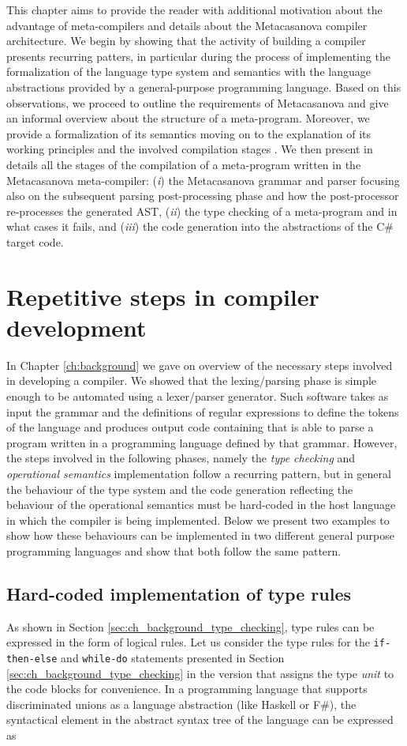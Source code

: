 This chapter aims to provide the reader with additional motivation about the advantage of meta-compilers and details about the Metacasanova compiler architecture. We begin by showing that the activity of building a compiler presents recurring patters, in particular during the process of implementing the formalization of the language type system and semantics with the language abstractions provided by a general-purpose programming language. Based on this observations, we proceed to outline the requirements of Metacasanova and give an informal overview about the structure of a meta-program. Moreover, we provide a formalization of its semantics moving on to the explanation of its working principles and the involved compilation stages . We then present in details all the stages of the compilation of a meta-program written in the Metacasanova meta-compiler: (\textit{i}) the Metacasanova grammar and parser focusing also on the subsequent parsing post-processing phase and how the post-processor re-processes the generated AST, (\textit{ii}) the type checking of a meta-program and in what cases it fails, and (\textit{iii}) the code generation into the abstractions of the C\# target code.


\section{Repetitive steps in compiler development}
\label{sec:ch_metacasanova_intro}
In Chapter \ref{ch:background} we gave on overview of the necessary steps involved in developing a compiler. We showed that the lexing/parsing phase is simple enough to be automated using a lexer/parser generator. Such software takes as input the grammar and the definitions of regular expressions to define the tokens of the language and produces output code containing that is able to parse a program written in a programming language defined by that grammar. However, the steps involved in the following phases, namely the \textit{type checking} and \textit{operational semantics} implementation follow a recurring pattern, but in general the behaviour of the type system and the code generation reflecting the behaviour of the operational semantics must be hard-coded in the host language in which the compiler is being implemented. Below we present two examples to show how these behaviours can be implemented in two different general purpose programming languages and show that both follow the same pattern.

\subsection{Hard-coded implementation of type rules}
\label{sec:ch_metacasanova_hc_type_rules}
As shown in Section \ref{sec:ch_background_type_checking}, type rules can be expressed in the form of logical rules. Let us consider the type rules for the \texttt{if-then-else} and \texttt{while-do} statements presented in Section \ref{sec:ch_background_type_checking} in the version that assigns the type \textit{unit} to the code blocks for convenience. In a programming language that supports discriminated unions as a language abstraction (like Haskell or F\#), the syntactical element in the abstract syntax tree of the language can be expressed as

